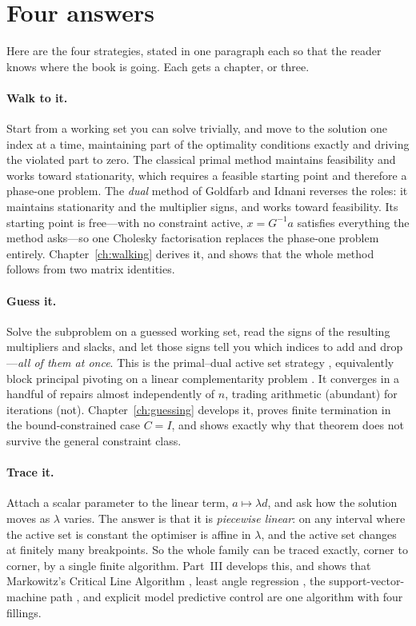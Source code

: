 \section{Four answers}

Here are the four strategies, stated in one paragraph each so that the reader
knows where the book is going. Each gets a chapter, or three.

\paragraph{Walk to it.} Start from a working set you can solve trivially, and
move to the solution one index at a time, maintaining part of the optimality
conditions exactly and driving the violated part to zero. The classical primal
method maintains feasibility and works toward stationarity, which requires a
feasible starting point and therefore a phase-one problem. The \emph{dual}
method of Goldfarb and Idnani \cite{goldfarb1982,goldfarb1983} reverses the
roles: it maintains stationarity and the multiplier signs, and works toward
feasibility. Its starting point is free---with no constraint active, $x = G^{-1}a$
satisfies everything the method asks---so one Cholesky factorisation replaces the
phase-one problem entirely. Chapter~\ref{ch:walking} derives it, and shows that
the whole method follows from two matrix identities.

\paragraph{Guess it.} Solve the subproblem on a guessed working set, read the
signs of the resulting multipliers and slacks, and let those signs tell you which
indices to add and drop---\emph{all of them at once}. This is the primal--dual
active set strategy \cite{hintermuller2002}, equivalently block principal
pivoting on a linear complementarity problem \cite{judice1994,murty1988}. It
converges in a handful of repairs almost independently of $n$, trading arithmetic
(abundant) for iterations (not). Chapter~\ref{ch:guessing} develops it, proves
finite termination in the bound-constrained case $C = I$, and shows exactly why
that theorem does not survive the general constraint class.

\paragraph{Trace it.} Attach a scalar parameter to the linear term,
$a \mapsto \lambda d$, and ask how the solution moves as $\lambda$ varies. The
answer is that it is \emph{piecewise linear}: on any interval where the active set
is constant the optimiser is affine in $\lambda$, and the active set changes at
finitely many breakpoints. So the whole family can be traced exactly, corner to
corner, by a single finite algorithm. Part~III develops this, and shows that
Markowitz's Critical Line Algorithm \cite{markowitz1956}, least angle regression
\cite{efron2004}, the support-vector-machine path \cite{hastie2004svm}, and
explicit model predictive control \cite{bemporad2002} are one algorithm with four
fillings.

